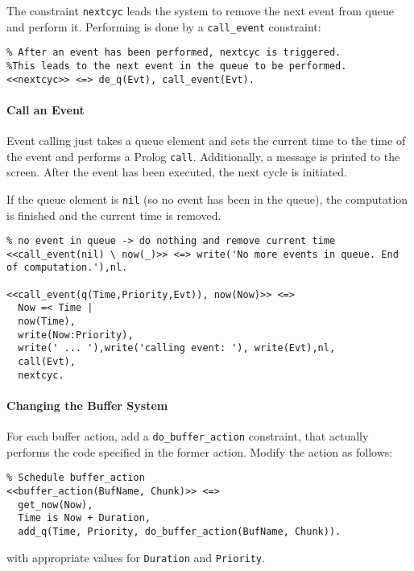 The constraint \verb|nextcyc| leads the system to remove the next event from queue and perform it. Performing is done by a \verb|call_event| constraint:

\begin{lstlisting}
% After an event has been performed, nextcyc is triggered. 
%This leads to the next event in the queue to be performed.
<<nextcyc>> <=> de_q(Evt), call_event(Evt).
\end{lstlisting}

\paragraph{Call an Event} 

Event calling just takes a queue element and sets the current time to the time of the event and performs a Prolog \verb|call|. Additionally, a message is printed to the screen. After the event has been executed, the next cycle is initiated.

If the queue element is \verb|nil| (so no event has been in the queue), the computation is finished and the current time is removed.

\begin{lstlisting}
% no event in queue -> do nothing and remove current time
<<call_event(nil) \ now(_)>> <=> write('No more events in queue. End of computation.'),nl.

<<call_event(q(Time,Priority,Evt)), now(Now)>> <=> 
  Now =< Time | 
  now(Time),
  write(Now:Priority),
  write(' ... '),write('calling event: '), write(Evt),nl,
  call(Evt),
  nextcyc.
\end{lstlisting}

\paragraph{Changing the Buffer System}
\label{changing_the_buffer_system}

For each buffer action, add a \verb|do_buffer_action| constraint, that actually performs the code specified in the former action. Modify the action as follows:

\begin{lstlisting}
% Schedule buffer_action
<<buffer_action(BufName, Chunk)>> <=> 
  get_now(Now),
  Time is Now + Duration, 
  add_q(Time, Priority, do_buffer_action(BufName, Chunk)). 
\end{lstlisting}

with appropriate values for \verb|Duration| and \verb|Priority|.

